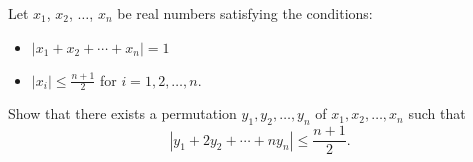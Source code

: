 Let $ x_1$,  $ x_2$,  $ \ldots$,  $ x_n$  be real numbers satisfying the conditions:

\begin{itemize}
	\item $ |x_1 + x_2 + \cdots + x_n | = 1$
	\item $ |x_i| \leq \displaystyle \frac{n + 1}{2}$  for $i = 1, 2, \ldots , n$. 
\end{itemize}

Show that there exists a permutation $y_1, y_2, \ldots, y_n$ of $ x_1, x_2, \ldots, x_n$ such that
\[ | y_1 + 2 y_2 + \cdots + n y_n | \leq \frac {n + 1}{2}.\]
